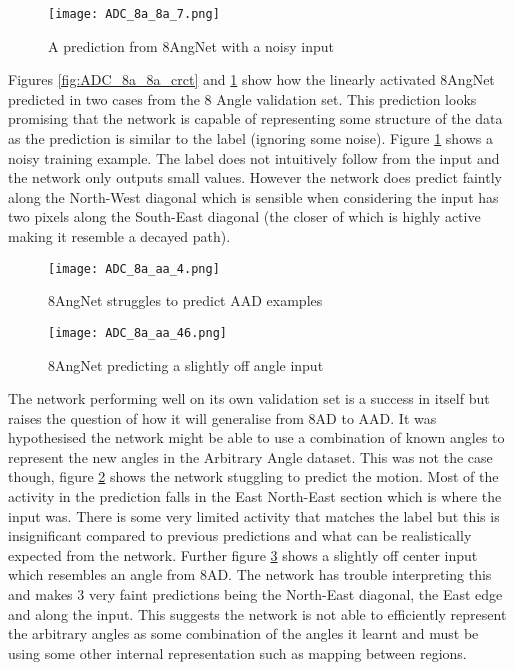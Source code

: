 \begin{figure}
    \centering
    \texttt{[image: ADC\_8a\_8a\_7.png]}
    \caption{A prediction from 8AngNet with a noisy input}
    \label{fig:ADC_8a_8a_noisy}
\end{figure}

Figures \ref{fig:ADC_8a_8a_crct} and \ref{fig:ADC_8a_8a_noisy} show how the linearly activated 8AngNet predicted in two cases from the 8 Angle validation set.
This prediction looks promising that the network is capable of representing some structure of the data as the prediction is similar to the label (ignoring some noise).
Figure \ref{fig:ADC_8a_8a_noisy} shows a noisy training example.
The label does not intuitively follow from the input and the network only outputs small values.
However the network does predict faintly along the North-West diagonal which is sensible when considering the input has two pixels along the South-East diagonal (the closer of which is highly active making it resemble a decayed path). 

\begin{figure}
    \centering
    \texttt{[image: ADC\_8a\_aa\_4.png]}
    \caption{8AngNet struggles to predict AAD examples}
    \label{fig:ADC_8aNoaa}
\end{figure}

\begin{figure}
    \centering
    \texttt{[image: ADC\_8a\_aa\_46.png]}
    \caption{8AngNet predicting a slightly off angle input}
    \label{fig:ADC_8aNoaa_fork}
\end{figure}

The network performing well on its own validation set is a success in itself but raises the question of how it will generalise from 8AD to AAD.
It was hypothesised the network might be able to use a combination of known angles to represent the new angles in the Arbitrary Angle dataset.
This was not the case though, figure \ref{fig:ADC_8aNoaa} shows the network stuggling to predict the motion.
Most of the activity in the prediction falls in the East North-East section which is where the input was.
There is some very limited activity that matches the label but this is insignificant compared to previous predictions and what can be realistically expected from the network. 
Further figure \ref{fig:ADC_8aNoaa_fork} shows a slightly off center input which resembles an angle from 8AD. 
The network has trouble interpreting this and makes 3 very faint predictions being the North-East diagonal, the East edge and along the input.
This suggests the network is not able to efficiently represent the arbitrary angles as some combination of the angles it learnt and must be using some other internal representation such as mapping between regions.

